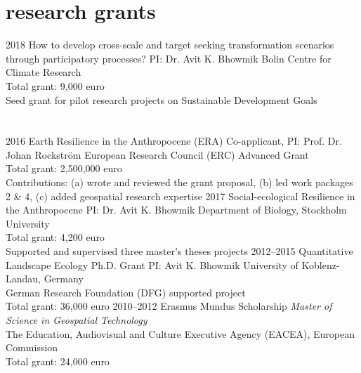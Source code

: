 \documentclass[]{friggeri-cv} %
\begin{document}
\begin{refsection}
\nocite{*}
\printbibliography[type={inproceedings}, keyword=presconf, title={conference presentations \& abstracts}, heading=subbibliography]
\end{refsection}


\section{research grants}

\begin{entrylist}
\entry
{\small{2018}}
{How to develop cross-scale and target seeking transformation scenarios through participatory processes?}
{PI: Dr. Avit K. Bhowmik}
{Bolin Centre for Climate Research\\
Total grant: 9,000 euro\\
Seed grant for pilot research projects on Sustainable Development Goals}
\end{entrylist}
\section{}
\begin{entrylist}
\entry
{\small{2016}}
{Earth Resilience in the Anthropocene (ERA)}
{Co-applicant, PI: Prof. Dr. Johan Rockström}
{European Research Council (ERC) Advanced Grant\\
Total grant: 2,500,000 euro\\
Contributions: (a) wrote and reviewed the grant proposal, (b) led work packages 2 \& 4, (c) added geospatial research expertise}
\entry
{\small{2017}}
{Social-ecological Resilience in the Anthropocene}
{PI: Dr. Avit K. Bhowmik}
{Department of Biology, Stockholm University\\
Total grant: 4,200 euro\\
Supported and supervised three master's theses projects}
\entry
{\small{2012--2015}}
{Quantitative Landscape Ecology Ph.D. Grant}
{PI: Avit K. Bhowmik}
{University of Koblenz-Landau, Germany\\
German Research Foundation (DFG) supported project\\
Total grant: 36,000 euro}
\entry
{\small{2010--2012}}
{Erasmus Mundus Scholarship}
{}
{{\emph{Master of Science in Geospatial Technology}} \\
The Education, Audiovisual and Culture Executive Agency (EACEA), European Commission\\
Total grant: 24,000 euro}
\end{entrylist}
\end{document}
